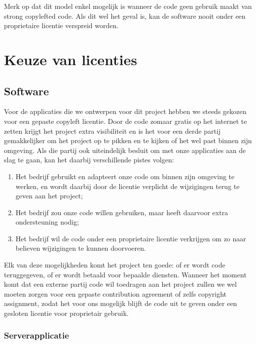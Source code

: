 Merk op dat dit model enkel mogelijk is wanneer de code geen gebruik maakt van strong copylefted code. Als dit wel het geval is, kan de software nooit onder een proprietaire licentie verspreid worden.

\section{Keuze van licenties}
\label{ontwerp:licenties:keuze}

\subsection{Software}
\label{ontwerp:licenties:keuze:software}

Voor de applicaties die we ontwerpen voor dit project hebben we steeds gekozen voor een gepaste copyleft licentie. Door de code zomaar gratis op het internet te zetten krijgt het project extra visibiliteit en is het voor een derde partij gemakkelijker om het project op te pikken en te kijken of het wel past binnen zijn omgeving. Als die partij ook uiteindelijk besluit om met onze applicaties aan de slag te gaan, kan het daarbij verschillende pistes volgen:
\begin{enumerate}
  \item Het bedrijf gebruikt en adapteert onze code om binnen zijn omgeving te werken, en wordt daarbij door de licentie verplicht de wijzigingen terug te geven aan het project;
  \item Het bedrijf zou onze code willen gebruiken, maar heeft daarvoor extra ondersteuning nodig;
  \item Het bedrijf wil de code onder een proprietaire licentie verkrijgen om zo naar believen wijzigingen te kunnen doorvoeren.
\end{enumerate}
Elk van deze mogelijkheden komt het project ten goede: of er wordt code teruggegeven, of er wordt betaald voor bepaalde diensten. Wanneer het moment komt dat een externe partij code wil toedragen aan het project zullen we wel moeten zorgen voor een gepaste contribution agreement of zelfs copyright assignment, zodat het voor ons mogelijk blijft de code uit te geven onder een gesloten licentie voor proprietair gebruik.

\subsubsection{Serverapplicatie}
\label{ontwerp:licenties:keuze:software:server}

